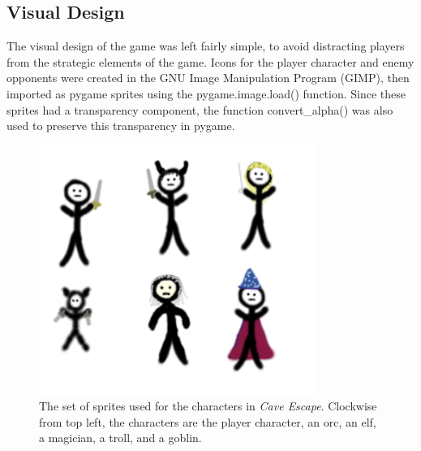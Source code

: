\subsection{Visual Design}
The visual design of the game was left fairly simple, to avoid distracting players from the strategic elements of the game. Icons for the player character and enemy opponents were created in the GNU Image Manipulation Program (GIMP), then imported as pygame sprites using the pygame.image.load() function. Since these sprites had a transparency component, the function convert\_alpha() was also used to preserve this transparency in pygame.\\

\begin{figure}[H]
  \centering
  \includegraphics[width=9cm]{sprites/SpriteSheet.png}
  \caption{The set of sprites used for the characters in \textit{Cave Escape}. Clockwise from top left, the characters are the player character, an orc, an elf, a magician, a troll, and a goblin.}
  \label{fig:SpriteSheet}
\end{figure}

